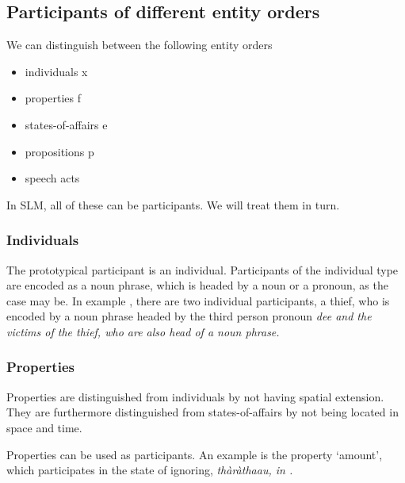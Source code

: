 \subsection{Participants of different entity orders}\label{sec:func:Participantsofdifferententityorders}
We can distinguish between the following entity orders

\begin{itemize}
 \item individuals x
 \item properties f
 \item states-of-affairs e
 \item propositions p
 \item speech acts
\end{itemize}

In SLM, all of these can be participants. We will treat them in turn.

\subsubsection{Individuals}\label{sec:func:Individuals}
The prototypical participant is an individual. Participants of the individual type are encoded as a noun phrase, which is headed by a noun or a pronoun, as the case may be. In example , there are two individual participants, a thief, who is encoded by a noun phrase headed by the third person pronoun \em dee \em and the victims of the thief, who are also head of a noun phrase.




\subsubsection{Properties}\label{sec:func:Properties}
Properties are distinguished from individuals by not having spatial extension\kuckn. They are furthermore distinguished from states-of-affairs by not being located in space and time.

Properties can be used as participants. An example is the property `amount', which participates in the state of ignoring, \em thàràthaau\em, in .

